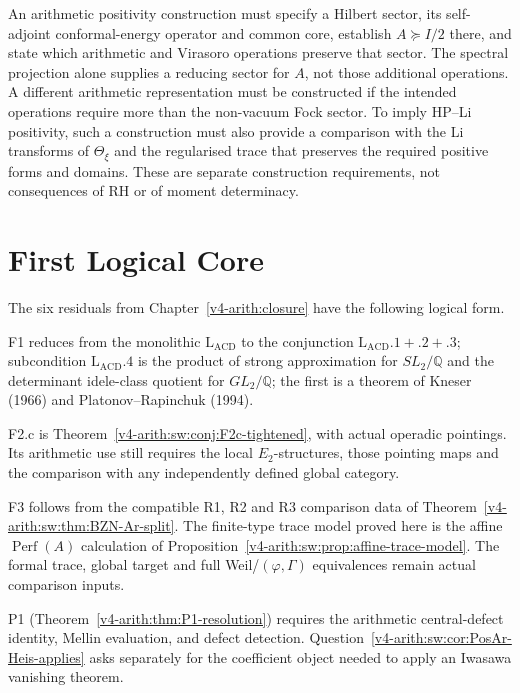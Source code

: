 \begin{remark}
\label{v4-arith:sw:rem:VB-converse-finer}
An arithmetic positivity construction must specify a Hilbert sector,
its self-adjoint conformal-energy operator and common core, establish
\(A\succeq I/2\) there, and state which arithmetic and Virasoro
operations preserve that sector. The spectral projection alone
supplies a reducing sector for \(A\), not those additional operations.
A different arithmetic representation must be constructed if the
intended operations require more than the non-vacuum Fock sector.
To imply HP--Li positivity, such a construction must also provide a
comparison with the Li transforms of \(\Theta_\xi\) and the
regularised trace that preserves the required positive forms and
domains. These are separate construction requirements, not
consequences of RH or of moment determinacy.
\end{remark}

\section{First Logical Core}
\label{v4-arith:sw:post-list}

The six residuals from Chapter~\ref{v4-arith:closure} have the
following logical form.

F1 reduces from the monolithic \(\mathrm{L}_{\mathrm{ACD}}\) to the
conjunction \(\mathrm{L}_{\mathrm{ACD}}.1+.2+.3\); subcondition
\(\mathrm{L}_{\mathrm{ACD}}.4\) is the product of strong approximation
for \(SL_{2}/\mathbb{Q}\) and the determinant idele-class quotient for
\(GL_{2}/\mathbb{Q}\); the first is a theorem of Kneser (1966) and
Platonov--Rapinchuk
(1994).

F2.c is Theorem~\ref{v4-arith:sw:conj:F2c-tightened}, with actual
operadic pointings.
Its arithmetic use still requires the local \(E_2\)-structures,
those pointing maps and the comparison with any independently
defined global category.

F3 follows from the compatible R1, R2 and R3 comparison data of
Theorem~\ref{v4-arith:sw:thm:BZN-Ar-split}. The finite-type trace
model proved here is the affine \(\operatorname{Perf}(A)\)
calculation of Proposition~\ref{v4-arith:sw:prop:affine-trace-model}.
The formal trace, global target and full Weil/\((\varphi,\Gamma)\)
equivalences remain actual comparison inputs.

P1 (Theorem~\ref{v4-arith:thm:P1-resolution}) requires the arithmetic
central-defect identity, Mellin evaluation, and defect detection.
Question~\ref{v4-arith:sw:cor:PosAr-Heis-applies} asks separately
for the coefficient object needed to apply an Iwasawa vanishing theorem.

